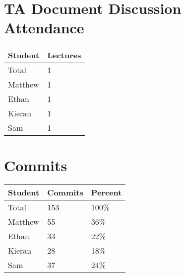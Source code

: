\documentclass{article}
\begin{document}

\section{TA Document Discussion Attendance}


\begin{table}[H]
\centering
\begin{tabular}{ll}
\toprule
\textbf{Student} & \textbf{Lectures}\\
\midrule
Total & 1\\
Matthew & 1\\
Ethan & 1\\
Kieran & 1\\
Sam & 1\\
\bottomrule
\end{tabular}
\end{table}


\section{Commits}


\begin{table}[H]
\centering
\begin{tabular}{lll}
\toprule
\textbf{Student} & \textbf{Commits} & \textbf{Percent}\\
\midrule
Total & 153 & 100\% \\
Matthew & 55 & 36\% \\
Ethan & 33 & 22\% \\
Kieran & 28 & 18\% \\
Sam & 37 & 24\% \\
\bottomrule
\end{tabular}
\end{table}

\end{document}
